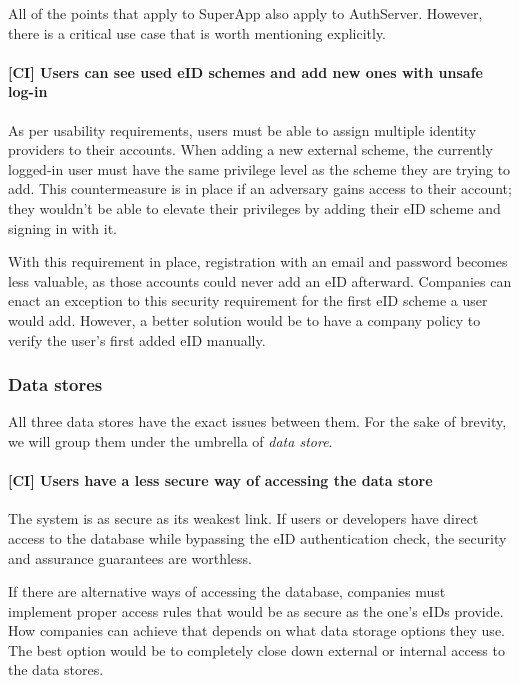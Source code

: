 All of the points that apply to SuperApp also apply to AuthServer. However, there is a critical use case that is worth mentioning explicitly.

\paragraph{[CI] Users can see used eID schemes and add new ones with unsafe log-in}

As per usability requirements, users must be able to assign multiple identity providers to their accounts. When adding a new external scheme, the currently logged-in user must have the same privilege level as the scheme they are trying to add. This countermeasure is in place if an adversary gains access to their account; they wouldn't be able to elevate their privileges by adding their eID scheme and signing in with it.

With this requirement in place, registration with an email and password becomes less valuable, as those accounts could never add an eID afterward. Companies can enact an exception to this security requirement for the first eID scheme a user would add. However, a better solution would be to have a company policy to verify the user's first added eID manually.

\subsubsection{Data stores}

All three data stores have the exact issues between them. For the sake of brevity, we will group them under the umbrella of \textit{data store}.

\paragraph{[CI] Users have a less secure way of accessing the data store}

The system is as secure as its weakest link. If users or developers have direct access to the database while bypassing the eID authentication check, the security and assurance guarantees are worthless.

If there are alternative ways of accessing the database, companies must implement proper access rules that would be as secure as the one's eIDs provide. How companies can achieve that depends on what data storage options they use. The best option would be to completely close down external or internal access to the data stores.


